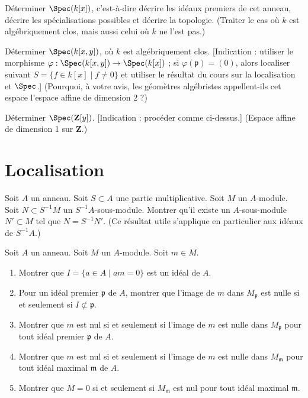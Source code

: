 \begin{exercise}
\label{exercise-primes-kx}
Déterminer $\Spec(k[x])$, c'est-à-dire décrire
les idéaux premiers de cet anneau, décrire les spécialisations possibles et
décrire la topologie. (Traiter le cas où $k$ est algébriquement clos, mais
aussi celui où $k$ ne l'est pas.)
\end{exercise}

\begin{exercise}
\label{exercise-primes-kxy}
 Déterminer $\Spec(k[x, y])$, où $k$ est algébriquement
clos.
[Indication : utiliser le morphisme
$\varphi : \Spec(k[x, y]) \to \Spec(k[x])$ ; si
$\varphi({\mathfrak p}) = (0)$, alors localiser suivant
$S = \{f\in k[x] \mid f \not = 0\}$ et utiliser le résultat du cours
sur la localisation et $\Spec$.]
(Pourquoi, à votre avis, les géomètres algébristes appellent-ils cet espace l'espace affine de dimension 2 ?)
\end{exercise}

\begin{exercise}
\label{exercise-primes-Zy}
Déterminer $\Spec(\mathbf{Z}[y])$.
[Indication : procéder comme ci-dessus.] (Espace affine de dimension 1 sur $\mathbf{Z}$.)
\end{exercise}






\section{Localisation}
\label{section-localization}


\begin{exercise}
\label{exercise-submodule-localization}
Soit $A$ un anneau. Soit $S \subset A$ une partie multiplicative.
Soit $M$ un $A$-module. Soit $N \subset S^{-1}M$ un $S^{-1}A$-sous-module.
Montrer qu'il existe un $A$-sous-module $N' \subset M$ tel que
$N = S^{-1}N'$. (Ce résultat utile s'applique en particulier aux idéaux
de $S^{-1}A$.)
\end{exercise}

\begin{exercise}
\label{exercise-localize-zero}
Soit $A$ un anneau. Soit $M$ un $A$-module. Soit $m \in M$.
\begin{enumerate}
\item Montrer que $I = \{a \in A \mid am = 0\}$ est un idéal de $A$.
\item Pour un idéal premier $\mathfrak p$ de $A$, montrer que l'image de $m$
dans $M_\mathfrak p$ est nulle si et seulement si $I \not \subset \mathfrak p$.
\item Montrer que $m$ est nul si et seulement si l'image de $m$ est nulle
dans $M_\mathfrak p$ pour tout idéal premier $\mathfrak p$ de $A$.
\item Montrer que $m$ est nul si et seulement si l'image de $m$ est nulle
dans $M_\mathfrak m$ pour tout idéal maximal $\mathfrak m$ de $A$.
\item Montrer que $M = 0$ si et seulement si $M_{\mathfrak m}$ est nul
pour tout idéal maximal $\mathfrak m$.
\end{enumerate}
\end{exercise}


